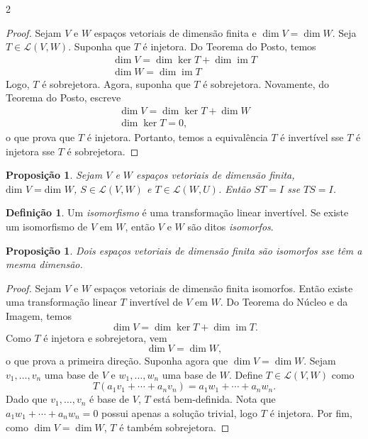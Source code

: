 \documentclass{article}
\theoremstyle{plain}
\newtheorem{prop}[thm]{Proposição}
\theoremstyle{definition}
\newtheorem{defn}{Definição}[section]
\theoremstyle{remark}
\DeclareMathOperator{\im}{im}
\begin{document}
\begin{multicols}{2}
\begin{proof}
    Sejam \(V\) e \(W\) espaços vetoriais de dimensão finita e \(\dim V = \dim W\). Seja \(T \in \mathcal{L}(V, W)\). Suponha que \(T\) é injetora. Do Teorema do Posto, temos 
    \begin{gather}
        \dim V = \dim \ker T + \dim \im T \\
        \dim W = \dim \im T
    \end{gather}
    Logo, \(T\) é sobrejetora. Agora, suponha que \(T\) é sobrejetora. Novamente, do Teorema do Posto, escreve 
    \begin{gather}
        \dim V = \dim \ker T + \dim W \\
        \dim \ker T = 0,
    \end{gather} 
    \noindent o que prova que \(T\) é injetora. Portanto, temos a equivalência \(T\) é invertível sse \(T\) é injetora sse \(T\) é sobrejetora.
\end{proof}

\begin{prop}
    Sejam \(V\) e \(W\) espaços vetoriais de dimensão finita, \(\text{dim } V = \text{dim } W\), \(S \in \mathcal{L}(V, W)\) e \(T \in \mathcal{L}(W, U)\). Então \(ST = I\) sse \(TS = I\).
\end{prop}

\begin{defn}
    Um \emph{isomorfismo} é uma transformação linear invertível. Se existe um isomorfismo de \(V\) em \(W\), então \(V\) e \(W\) são ditos \emph{isomorfos}.
\end{defn}

\begin{prop}
    Dois espaços vetoriais de dimensão finita são isomorfos sse têm a mesma dimensão.
\end{prop}

\begin{proof}
    Sejam \(V\) e \(W\) espaços vetoriais de dimensão finita isomorfos. Então existe uma transformação linear \(T\) invertível de \(V\) em \(W\). Do Teorema do Núcleo e da Imagem, temos 
    \[
        \dim V = \dim \ker T + \dim \im T.
    \]
    Como \(T\) é injetora e sobrejetora, vem
    \[
        \dim V = \dim W,
    \]
    \noindent o que prova a primeira direção. Suponha agora que \(\dim V = \dim W\). Sejam \(v_1, \ldots, v_n\) uma base de \(V\) e \(w_1, \ldots, w_n\) uma base de \(W\). Define \(T \in \mathcal{L}(V, W)\) como 
    \[
        T(a_1 v_1 + \cdots + a_n v_n) = a_1 w_1 + \cdots + a_n w_n.
    \]
    Dado que \(v_1, \ldots, v_n\) é base de \(V\), \(T\) está bem-definida. Nota que \(a_1 w_1 + \cdots + a_n w_n = 0\) possui apenas a solução trivial, logo \(T\) é injetora. Por fim, como \(\dim V = \dim W\), \(T\) é também sobrejetora.
\end{proof}


\end{multicols}
\end{document}
